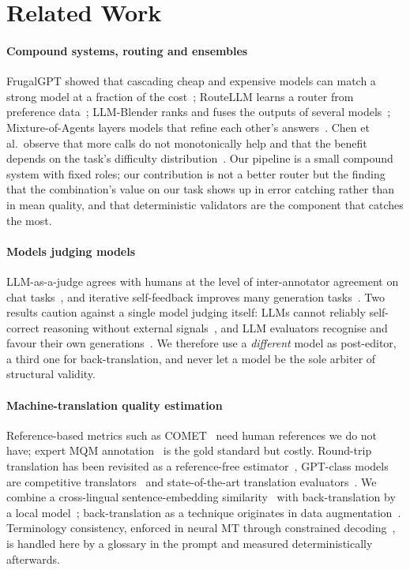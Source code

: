\section{Related Work}
\label{sec:related}

\paragraph{Compound systems, routing and ensembles}
FrugalGPT showed that cascading cheap and expensive models can match a strong model at a fraction of the cost~\cite{chen2023frugalgpt}; RouteLLM learns a router from preference data~\cite{ong2024routellm}; LLM-Blender ranks and fuses the outputs of several models~\cite{jiang2023blender}; Mixture-of-Agents layers models that refine each other's answers~\cite{wang2024moa}. Chen et al.\ observe that more calls do not monotonically help and that the benefit depends on the task's difficulty distribution~\cite{chen2024compound}. Our pipeline is a small compound system with fixed roles; our contribution is not a better router but the finding that the combination's value on our task shows up in error catching rather than in mean quality, and that deterministic validators are the component that catches the most.

\paragraph{Models judging models}
LLM-as-a-judge agrees with humans at the level of inter-annotator agreement on chat tasks~\cite{zheng2023judge}, and iterative self-feedback improves many generation tasks~\cite{madaan2023selfrefine,shinn2023reflexion}. Two results caution against a single model judging itself: LLMs cannot reliably self-correct reasoning without external signals~\cite{huang2024selfcorrect}, and LLM evaluators recognise and favour their own generations~\cite{panickssery2024selfpref}. We therefore use a \emph{different} model as post-editor, a third one for back-translation, and never let a model be the sole arbiter of structural validity.

\paragraph{Machine-translation quality estimation}
Reference-based metrics such as COMET~\cite{rei2020comet} need human references we do not have; expert MQM annotation~\cite{freitag2021mqm} is the gold standard but costly. Round-trip translation has been revisited as a reference-free estimator~\cite{moon2020roundtrip}, GPT-class models are competitive translators~\cite{hendy2023gpt} and state-of-the-art translation evaluators~\cite{kocmi2023gemba}. We combine a cross-lingual sentence-embedding similarity~\cite{reimers2019sbert,reimers2020multilingual} with back-translation by a local model~\cite{gemma2025}; back-translation as a technique originates in data augmentation~\cite{sennrich2016backtranslation}. Terminology consistency, enforced in neural MT through constrained decoding~\cite{dinu2019terminology}, is handled here by a glossary in the prompt and measured deterministically afterwards.

